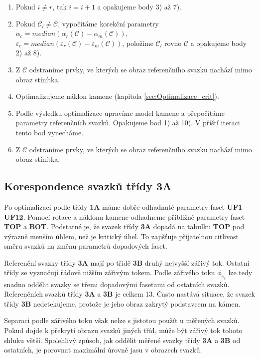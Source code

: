 \begin{enumerate}
\item Pokud $i \neq r$, tak $i = i+1$ a opakujeme body 3) až 7).

\item Pokud $\mathcal{C}_{l} \neq \mathcal{C}$, vypočítáme korekční parametry $\alpha_{c} = median(\alpha_{r}(\mathcal{C})-\alpha_{m}(\mathcal{C}))$, \\ $\varepsilon_{c} = median(\varepsilon_{r}(\mathcal{C})-\varepsilon_{m}(\mathcal{C}))$, položíme $\mathcal{C}_{l}$ rovno $\mathcal{C}$  a opakujeme body 2) až 8).

\item Z $\mathcal{C}$ odstraníme prvky, ve kterých se obraz referenčního svazku nachází mimo obraz stínítka.

\item Optimalizujeme náklon kamene (kapitola \ref{sec:Optimalizace_crit}).

\item Podle výsledku optimalizace upravíme model kamene a přepočítáme parametry referenčních svazků. Opakujeme bod 1) až 10). V příští iteraci tento bod vynecháme. 

\item Z $\mathcal{C}$ odstraníme prvky, ve kterých se obraz referenčního svazku nachází mimo obraz stínítka.

\end{enumerate}
\newpage
\subsection{Korespondence svazků třídy \textbf{3A}}	
\label{sec:3A}
	Po optimalizaci podle třídy \textbf{1A} máme dobře odhadnuté parametry faset \textbf{UF1} - \textbf{UF12}. Pomocí rotace a náklonu kamene odhadneme přibližně parametry faset \textbf{TOP} a \textbf{BOT}. Podstatné je, že svazek třídy \textbf{3A} dopadá na tabulku \textbf{TOP} pod výrazně menším úhlem, než je kritický úhel. To zajišťuje přijatelnou citlivost směru svazků na změnu parametrů dopadových faset. 
	
	Referenční svazky třídy \textbf{3A} mají po třídě \textbf{3B} druhý nejvyšší zářivý tok. Ostatní třídy se vyznačují řádově nižším zářivým tokem. Podle zářivého toku $\phi_{e_r}$  lze tedy snadno oddělit svazky se třemi dopadovými fasetami od ostatních svazků. Referenčních svazků třídy \textbf{3A} a \textbf{3B} je celkem 13. Často nastává situace, že svazek třídy \textbf{3B} nedetekujeme, protože je jeho obraz zakrytý podstavcem na kámen. 
	
	Separaci podle zářivého toku  však nelze s jistotou použít u měřených svazků. Pokud dojde k překrytí obrazu svazků jiných tříd, může být zářivý tok tohoto shluku větší. Spolehlivý způsob, jak oddělit měřené svazky třídy \textbf{3A} a \textbf{3B} od ostatních, je porovnat maximální úrovně jasu v obrazech svazků.  
	
